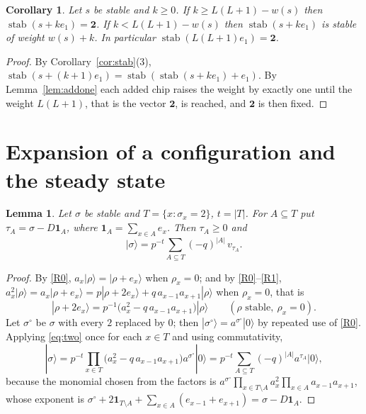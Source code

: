 \documentclass[11pt]{amsart}
\newtheorem{lemma}[theorem]{Lemma}
\newtheorem{corollary}[theorem]{Corollary}
\theoremstyle{definition}
\theoremstyle{remark}
\newcommand{\stab}{\operatorname{stab}}
\newcommand{\ket}[1]{|#1\rangle}
\newcommand{\two}{\mathbf{2}}
\begin{document}
\begin{corollary}\label{cor:climb}
Let $s$ be stable and $k\ge0$. If $k\ge L(L+1)-w(s)$ then $\stab(s+ke_1)=\two$. If $k<L(L+1)-w(s)$ then $\stab(s+ke_1)$ is stable of weight $w(s)+k$. In particular $\stab(L(L+1)e_1)=\two$.
\end{corollary}

\begin{proof}
By Corollary~\ref{cor:stab}(3), $\stab(s+(k+1)e_1)=\stab(\stab(s+ke_1)+e_1)$. By Lemma~\ref{lem:addone} each added chip raises the weight by exactly one until the weight $L(L+1)$, that is the vector $\two$, is reached, and $\two$ is then fixed.
\end{proof}

\section{Expansion of a configuration and the steady state}\label{sec:expansion}

\begin{lemma}\label{lem:expansion}
Let $\sigma$ be stable and $T=\{x:\sigma_x=2\}$, $t=|T|$. For $A\subseteq T$ put $\tau_A=\sigma-D\mathbf 1_A$, where $\mathbf 1_A=\sum_{x\in A}e_x$. Then $\tau_A\ge0$ and
\[
\ket\sigma=p^{-t}\sum_{A\subseteq T}(-q)^{|A|}\,v_{\tau_A}.
\]
\end{lemma}

\begin{proof}
By \eqref{R0}, $a_x\ket{\rho}=\ket{\rho+e_x}$ when $\rho_x=0$; and by \eqref{R0}--\eqref{R1}, $a_x^2\ket{\rho}=a_x\ket{\rho+e_x}=p\ket{\rho+2e_x}+q\,a_{x-1}a_{x+1}\ket\rho$ when $\rho_x=0$, that is
\begin{equation}\label{eq:two}
\ket{\rho+2e_x}=p^{-1}\bigl(a_x^2-q\,a_{x-1}a_{x+1}\bigr)\ket\rho\qquad(\rho\text{ stable},\ \rho_x=0).
\end{equation}
Let $\sigma^\circ$ be $\sigma$ with every $2$ replaced by $0$; then $\ket{\sigma^\circ}=a^{\sigma^\circ}\ket0$ by repeated use of \eqref{R0}. Applying \eqref{eq:two} once for each $x\in T$ and using commutativity,
\[
\ket\sigma=p^{-t}\prod_{x\in T}\bigl(a_x^2-q\,a_{x-1}a_{x+1}\bigr)a^{\sigma^\circ}\ket0=p^{-t}\sum_{A\subseteq T}(-q)^{|A|}a^{\tau_A}\ket0,
\]
because the monomial chosen from the factors is $a^{\sigma^\circ}\prod_{x\in T\setminus A}a_x^2\prod_{x\in A}a_{x-1}a_{x+1}$, whose exponent is $\sigma^\circ+2\mathbf 1_{T\setminus A}+\sum_{x\in A}(e_{x-1}+e_{x+1})=\sigma-D\mathbf 1_A$.
\end{proof}
\end{document}
